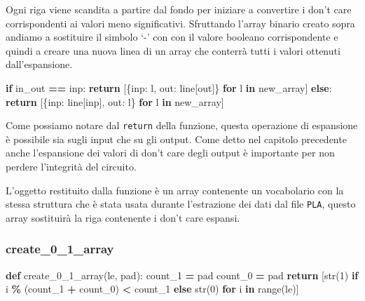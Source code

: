 \documentclass[
  italian,
]{book}
\newenvironment{Shaded}{\begin{snugshade}}{\end{snugshade}}
\newcommand{\BuiltInTok}[1]{#1}
\newcommand{\ControlFlowTok}[1]{\textcolor[rgb]{0.13,0.29,0.53}{\textbf{#1}}}
\newcommand{\DecValTok}[1]{\textcolor[rgb]{0.00,0.00,0.81}{#1}}
\newcommand{\KeywordTok}[1]{\textcolor[rgb]{0.13,0.29,0.53}{\textbf{#1}}}
\newcommand{\NormalTok}[1]{#1}
\newcommand{\OperatorTok}[1]{\textcolor[rgb]{0.81,0.36,0.00}{\textbf{#1}}}
\newcommand{\StringTok}[1]{\textcolor[rgb]{0.31,0.60,0.02}{#1}}
\begin{document}
Ogni riga viene scandita a partire dal fondo per iniziare a convertire i don't care corrispondenti ai valori meno significativi. Sfruttando l'array binario creato sopra andiamo a sostituire il simbolo `-' con con il valore booleano corrispondente e quindi a creare una nuova linea di un array che conterrà tutti i valori ottenuti dall'espansione.

\newpage

\begin{Shaded}
\begin{Highlighting}[]
\ControlFlowTok{if}\NormalTok{ in\_out }\OperatorTok{==} \StringTok{\textquotesingle{}inp\textquotesingle{}}\NormalTok{:}
  \ControlFlowTok{return}\NormalTok{ [\{}\StringTok{\textquotesingle{}inp\textquotesingle{}}\NormalTok{:  l, }\StringTok{\textquotesingle{}out\textquotesingle{}}\NormalTok{:  line[}\StringTok{\textquotesingle{}out\textquotesingle{}}\NormalTok{]\} }\ControlFlowTok{for}\NormalTok{ l }\KeywordTok{in}\NormalTok{ new\_array]}
\ControlFlowTok{else}\NormalTok{:}
  \ControlFlowTok{return}\NormalTok{ [\{}\StringTok{\textquotesingle{}inp\textquotesingle{}}\NormalTok{:  line[}\StringTok{\textquotesingle{}inp\textquotesingle{}}\NormalTok{], }\StringTok{\textquotesingle{}out\textquotesingle{}}\NormalTok{:  l\} }\ControlFlowTok{for}\NormalTok{ l }\KeywordTok{in}\NormalTok{ new\_array]}
\end{Highlighting}
\end{Shaded}

Come possiamo notare dal \texttt{return} della funzione, questa operazione di espansione è possibile sia sugli input che su gli output. Come detto nel capitolo precedente anche l'espansione dei valori di don't care degli output è importante per non perdere l'integrità del circuito.

L'oggetto restituito dalla funzione è un array contenente un vocabolario con la stessa struttura che è stata usata durante l'estrazione dei dati dal file \texttt{PLA}, questo array sostituirà la riga contenente i don't care espansi.

\hypertarget{create_0_1_array}{%
\subsubsection{create\_0\_1\_array}\label{create_0_1_array}}

\begin{Shaded}
\begin{Highlighting}[]
\KeywordTok{def}\NormalTok{ create\_0\_1\_array(le, pad):}
\NormalTok{  count\_1 }\OperatorTok{=}\NormalTok{ pad}
\NormalTok{  count\_0 }\OperatorTok{=}\NormalTok{ pad}
  \ControlFlowTok{return}\NormalTok{ [}\BuiltInTok{str}\NormalTok{(}\DecValTok{1}\NormalTok{) }\ControlFlowTok{if}\NormalTok{ i }\OperatorTok{\%}\NormalTok{ (count\_1 }\OperatorTok{+}\NormalTok{ count\_0) }\OperatorTok{\textless{}}\NormalTok{ count\_1 }
    \ControlFlowTok{else} \BuiltInTok{str}\NormalTok{(}\DecValTok{0}\NormalTok{) }\ControlFlowTok{for}\NormalTok{ i }\KeywordTok{in} \BuiltInTok{range}\NormalTok{(le)]}
\end{Highlighting}
\end{Shaded}
\end{document}
